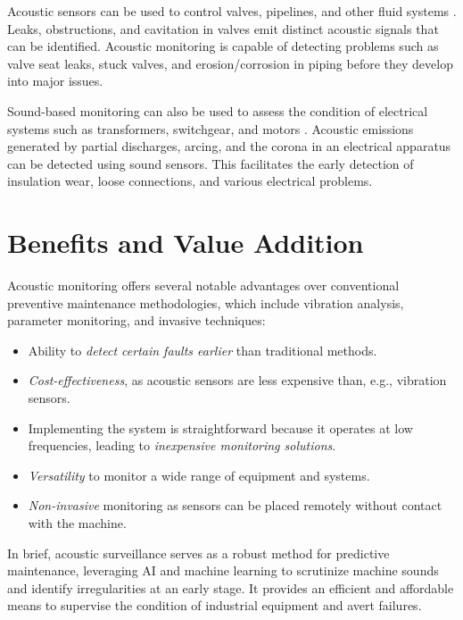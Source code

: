 \documentclass[12pt]{article}
\begin{document}
Acoustic sensors can be used to control valves, pipelines, and other fluid systems \cite{judith2017}. Leaks, obstructions, and cavitation in valves emit distinct acoustic signals that can be identified. Acoustic monitoring is capable of detecting problems such as valve seat leaks, stuck valves, and erosion/corrosion in piping before they develop into major issues.

Sound-based monitoring can also be used to assess the condition of electrical systems such as transformers, switchgear, and motors \cite{avinton2023}. Acoustic emissions generated by partial discharges, arcing, and the corona in an electrical apparatus can be detected using sound sensors. This facilitates the early detection of insulation wear, loose connections, and various electrical problems.

\section{Benefits and Value Addition}

Acoustic monitoring offers several notable advantages over conventional preventive maintenance methodologies, which include vibration analysis, parameter monitoring, and invasive techniques:
\begin{itemize}
    \item Ability to \textit{detect certain faults earlier} than traditional methods.
    \item \textit{Cost-effectiveness}, as acoustic sensors are less expensive than, e.g., vibration sensors.
    \item Implementing the system is straightforward because it operates at low frequencies, leading to \textit{inexpensive monitoring solutions}.
    \item \textit{Versatility} to monitor a wide range of equipment and systems.
    \item \textit{Non-invasive} monitoring as sensors can be placed remotely without contact with the machine.
\end{itemize}

In brief, acoustic surveillance serves as a robust method for predictive maintenance, leveraging AI and machine learning to scrutinize machine sounds and identify irregularities at an early stage. It provides an efficient and affordable means to supervise the condition of industrial equipment and avert failures.
\end{document}
